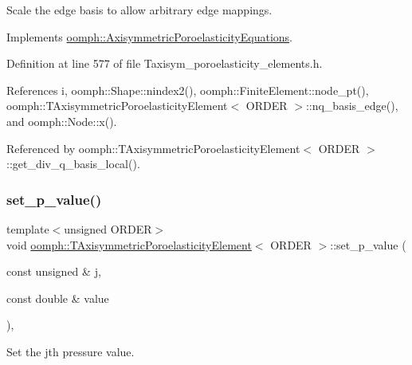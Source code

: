 Scale the edge basis to allow arbitrary edge mappings. 



Implements \hyperlink{classoomph_1_1AxisymmetricPoroelasticityEquations_a252e63649ec2c65c1d0b8c7f461a11c6}{oomph\+::\+Axisymmetric\+Poroelasticity\+Equations}.



Definition at line 577 of file Taxisym\+\_\+poroelasticity\+\_\+elements.\+h.



References i, oomph\+::\+Shape\+::nindex2(), oomph\+::\+Finite\+Element\+::node\+\_\+pt(), oomph\+::\+T\+Axisymmetric\+Poroelasticity\+Element$<$ O\+R\+D\+E\+R $>$\+::nq\+\_\+basis\+\_\+edge(), and oomph\+::\+Node\+::x().



Referenced by oomph\+::\+T\+Axisymmetric\+Poroelasticity\+Element$<$ O\+R\+D\+E\+R $>$\+::get\+\_\+div\+\_\+q\+\_\+basis\+\_\+local().

\mbox{\label{classoomph_1_1TAxisymmetricPoroelasticityElement_a8156a72c0ba1887945532e528ff5173a}} 
\subsubsection{\texorpdfstring{set\+\_\+p\+\_\+value()}{set\_p\_value()}}
{\footnotesize\ttfamily template$<$unsigned O\+R\+D\+ER$>$ \\
void \hyperlink{classoomph_1_1TAxisymmetricPoroelasticityElement}{oomph\+::\+T\+Axisymmetric\+Poroelasticity\+Element}$<$ O\+R\+D\+ER $>$\+::set\+\_\+p\+\_\+value (\begin{DoxyParamCaption}\item[{const unsigned \&}]{j,  }\item[{const double \&}]{value }\end{DoxyParamCaption})\hspace{0.3cm}{\ttfamily [inline]}, {\ttfamily [virtual]}}



Set the jth pressure value. 



